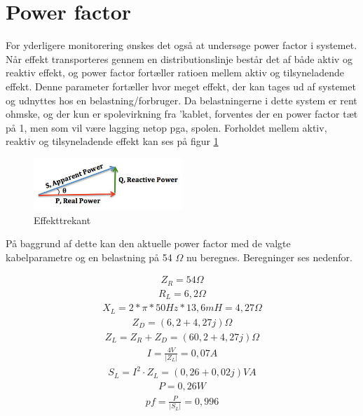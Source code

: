\section{Power factor}

For yderligere monitorering ønskes det også at undersøge power factor i systemet. Når effekt transporteres gennem en distributionslinje består det af både aktiv og reaktiv effekt, og power factor fortæller ratioen mellem aktiv og tilsyneladende effekt. Denne parameter fortæller hvor meget effekt, der kan tages ud af systemet og udnyttes hos en belastning/forbruger. Da belastningerne i dette system er rent ohmske, og der kun er spolevirkning fra 'kablet, forventes der en power factor tæt på 1, men som vil være lagging netop pga, spolen. Forholdet mellem aktiv, reaktiv og tilsyneladende effekt kan ses på figur \ref{fig:Effekttrekant}

\begin{figure}[H] 
	\centering
	\includegraphics[width=0.5\textwidth]{Figure/Effekttrekant}
	\caption{Effekttrekant}
	\label{fig:Effekttrekant}
\end{figure}

På baggrund af dette kan den aktuelle power factor med de valgte kabelparametre og en belastning på 54 $\Omega$ nu beregnes. Beregninger ses nedenfor.

\begin{align}
Z_R=54 \Omega
\end{align}
\begin{align}
R_L=6,2\Omega
\end{align}
\begin{align}
X_L=2*\pi*50Hz*13,6mH=4,27\Omega
\end{align}
\begin{align}
Z_D=(6,2+4,27j)\Omega
\end{align}
\begin{align}
Z_L=Z_R+Z_D=(60,2+4,27j)\Omega
\end{align}
\begin{align}
I=\frac{4V}{\vert Z_L \vert} = 0,07 A
\end{align}
\begin{align}
S_L=I^2\cdot Z_L = (0,26+0,02j) VA
\end{align}
\begin{align}
P=0,26 W
\end{align}
\begin{align}
pf= \frac{P}{\vert S_L \vert} = 0,996
\end{align}

